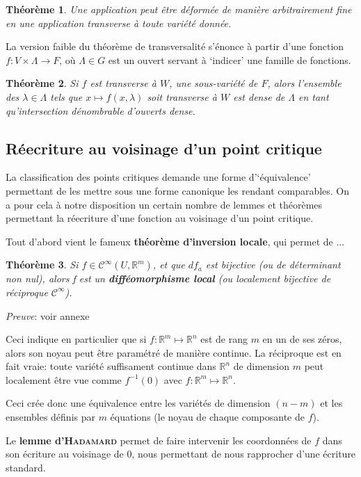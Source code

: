\documentclass{article}
\newcommand{\cinf}{\mathcal{C}^\infty}
\newcommand{\R}{\mathbb{R}}
\theoremstyle{definition}
\theoremstyle{plain}
\newtheorem{thm}{Théorème}
\begin{document}
\begin{thm}
Une application peut être déformée de manière arbitrairement fine en une application transverse à toute variété donnée.
\end{thm}

La version faible du théorème de transversalité s'énonce à partir d'une fonction $f: V\times\Lambda\to F$, où $\Lambda\in G$ est un ouvert servant à `indicer' une famille de fonctions.

\begin{thm}
	Si $f$ est transverse à $W$, une sous-variété de $F$, alors l'ensemble des $\lambda\in\Lambda$ tels que $x\mapsto f(x,\lambda)$ soit transverse à $W$ est dense de $\Lambda$ en tant qu'intersection dénombrable d'ouverts dense.
\end{thm}

\subsection{Réecriture au voisinage d'un point critique}

La classification des points critiques demande une forme d'`équivalence' permettant de les mettre sous une forme canonique les rendant comparables.
On a pour cela à notre disposition un certain nombre de lemmes et théorèmes permettant la réecriture d'une fonction au voisinage d'un point critique.

Tout d'abord vient le fameux \textbf{théorème d'inversion locale}, qui permet de ...

\begin{thm}
Si $f\in\cinf(U,\R^m)$, et que $df_a$ est bijective (ou de déterminant non nul), alors f est un \textbf{difféomorphisme local} (ou localement bijective de réciproque $\cinf$).
\end{thm}

\textit{Preuve}: voir annexe

Ceci indique en particulier que si $f:\R^m\mapsto\R^n$ est de rang $m$ en un de ses zéros, alors son noyau peut être paramétré de manière continue.
La réciproque est en fait vraie: toute variété suffisament continue dans $\R^n$ de dimension $m$ peut localement être vue comme $f^{-1}(0)$ avec $f:\R^m\mapsto\R^n$.

Ceci crée donc une équivalence entre les variétés de dimension $(n-m)$ et les ensembles définis par $m$ équations (le noyau de chaque composante de $f$).

Le \textbf{lemme d'\textsc{Hadamard}} permet de faire intervenir les coordonnées de $f$ dans son écriture au voisinage de $0$, nous permettant de nous rapprocher d'une écriture standard.
\end{document}
